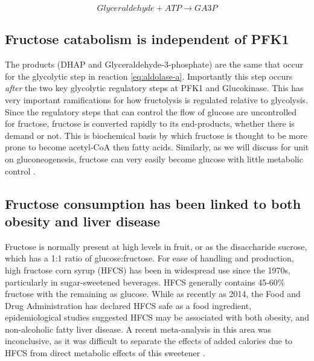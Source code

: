 \documentclass{tufte-handout}
\begin{document}
\begin{equation}
Glyceraldehyde + ATP \rightarrow GA3P
\end{equation}


\subsection{Fructose catabolism is independent of PFK1}

The products (DHAP and Glyceraldehyde-3-phosphate) are the same that occur for the glycolytic step in reaction \ref{eq:aldolase-a}.  Importantly this step occurs \emph{after} the two key glycolytic regulatory steps at PFK1 and Glucokinase.  This has very important ramifications for how fructolysis is regulated  relative to glycolysis.  Since the regulatory steps that can control the flow of glucose are uncontrolled for fructose, fructose is converted rapidly to its end-products, whether there is demand or not.  This is biochemical basis by which fructose is thought to be more prone to become acetyl-CoA then fatty acids.  Similarly, as we will discuss for unit on gluconeogenesis, fructose can very easily become glucose with little metabolic control \citep{Kim2016d}.

\subsection{Fructose consumption has been linked to both obesity and liver disease}

Fructose is normally present at high levels in fruit, or as the disaccharide sucrose, which has a 1:1 ratio of glucose:fructose.  For ease of handling and production, high fructose corn syrup (HFCS) has been in widespread use since the 1970s, particularly in sugar-sweetened beverages.  HFCS generally contains 45-60\% fructose with the remaining as glucose.   While as recently as 2014, the Food and Drug Administration has declared HFCS safe as a food ingredient, epidemiological studies suggested HFCS may be associated with both obesity, and non-alcoholic fatty liver disease.  A recent meta-analysis in this area was inconclusive, as it was difficult to separate the effects of added calories due to HFCS from direct metabolic effects of this sweetener \citep{Chung2014}.
\end{document}
